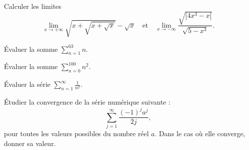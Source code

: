 \begin{exercice}
Calculer les limites
\[
\lim_{x\to +\infty} \sqrt{x+\sqrt{x+\sqrt{x}}}- \sqrt{x}
\quad\text{et}\quad
  \lim_{x\to -\infty} \frac{\sqrt{|4x^3-x|}}{\sqrt{5-x^3}}.
\]
\end{exercice}

\begin{exercice}
    Évaluer la somme $\sum_{n=1}^{63} n$.
\end{exercice}

\begin{exercice}
    Évaluer la somme $\sum_{n=0}^{100} n^2$.
\end{exercice}

\begin{exercice}
    Évaluer la série $\sum_{n=1}^{\infty} \frac{1}{n^2}$.
\end{exercice}

\begin{exercice}
  \'Etudier la convergence de la s\'erie num\'erique suivante :
  \[
   \sum_{j=1}^\infty \frac{(-1)^j a^j}{2j},
  \]
pour toutes les valeurs possibles du nombre r\'eel $a$. Dans le cas o\`u
elle converge, donner sa valeur.
\end{exercice}

